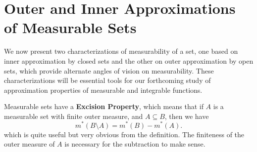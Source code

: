 \documentclass[../main.tex]{subfiles}
\begin{document}
\section{Outer and Inner Approximations of Measurable Sets}
We now present two characterizations of measurability of a set, one based on inner approximation by closed sets and the other on outer approximation by open sets, which provide alternate angles of vision on measurability. These characterizations will be essential tools for our forthcoming study of approximation properties of measurable and integrable functions.

Measurable sets have a \textbf{Excision Property}, which means that if $A$ is a measurable set with finite outer measure, and $A \subseteq B$, then we have
\begin{equation}
  m^*(B \setminus A) = m^*(B) - m^*(A).
\end{equation}
which is quite useful but very obvious from the definition. The finiteness of the outer measure of $A$ is necessary for the subtraction to make sense.
\end{document}

